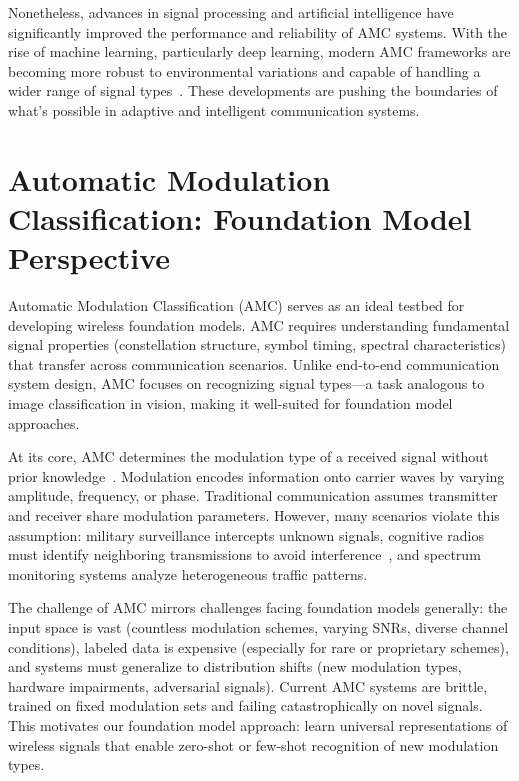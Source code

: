 Nonetheless, advances in signal processing and artificial intelligence have significantly improved the performance and reliability of AMC systems. With the rise of machine learning, particularly deep learning, modern AMC frameworks are becoming more robust to environmental variations and capable of handling a wider range of signal types~\cite{rajendran2018deep, oshea2016convolutional}. These developments are pushing the boundaries of what’s possible in adaptive and intelligent communication systems.


\section{Automatic Modulation Classification: Foundation Model Perspective}

Automatic Modulation Classification (AMC) serves as an ideal testbed for developing wireless foundation models. AMC requires understanding fundamental signal properties (constellation structure, symbol timing, spectral characteristics) that transfer across communication scenarios. Unlike end-to-end communication system design, AMC focuses on recognizing signal types—a task analogous to image classification in vision, making it well-suited for foundation model approaches.

At its core, AMC determines the modulation type of a received signal without prior knowledge~\cite{azzouz1996automatic}. Modulation encodes information onto carrier waves by varying amplitude, frequency, or phase. Traditional communication assumes transmitter and receiver share modulation parameters. However, many scenarios violate this assumption: military surveillance intercepts unknown signals, cognitive radios must identify neighboring transmissions to avoid interference~\cite{yucek2009survey}, and spectrum monitoring systems analyze heterogeneous traffic patterns.

The challenge of AMC mirrors challenges facing foundation models generally: the input space is vast (countless modulation schemes, varying SNRs, diverse channel conditions), labeled data is expensive (especially for rare or proprietary schemes), and systems must generalize to distribution shifts (new modulation types, hardware impairments, adversarial signals). Current AMC systems are brittle, trained on fixed modulation sets and failing catastrophically on novel signals. This motivates our foundation model approach: learn universal representations of wireless signals that enable zero-shot or few-shot recognition of new modulation types.

